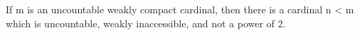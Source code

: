 If m is an uncountable weakly compact cardinal, then there is a cardinal n < m which is uncountable, weakly inaccessible, and not a power of 2.
